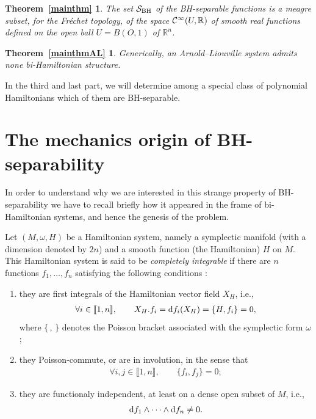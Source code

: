 \documentclass[pdftex]{sigma}%
\numberwithin{equation}{section}
\newtheorem*{Theorem1}{Theorem~\ref{mainthm}}
\newtheorem*{Theorem2}{Theorem~\ref{mainthmAL}}
\begin{document}
\begin{Theorem1}
The set ${\cal S}_{\rm BH}$ of the BH-separable functions is a meagre subset, for the Fr\'echet topology, of the space ${\cal C}^{\infty}(U,\mathbb{R})$ of smooth real functions defined on the open ball $U=B(O,1)$ of $\mathbb{R}^n$.
\end{Theorem1}

\begin{Theorem2} Generically, an Arnold--Liouville system admits none bi-Hamiltonian structure.
\end{Theorem2}

In the third and last part, we will determine among a special class of polynomial Hamiltonians which of them are BH-separable.

\section{The mechanics origin of BH-separability}

In order to understand why we are interested in this strange property of BH-separability we have to recall briefly how it appeared in the frame of bi-Hamiltonian systems, and hence the genesis of the problem.

Let $(M,\omega,H)$ be a Hamiltonian system, namely a symplectic manifold (with a dimension denoted by $2n$) and a smooth function (the Hamiltonian) $H$ on $M$. This Hamiltonian system is said to be {\it completely integrable} if there are $n$ functions $f_1,\dots,f_n$ satisfying the following conditions \cite{AbMa, Arn,LiMa}:
\begin{enumerate}\itemsep=0pt
\item[(1)] they are first integrals of the Hamiltonian vector field $X_H$, i.e.,
\begin{gather*}
\forall i\in\llbracket 1,n\rrbracket,\qquad X_H.f_i={\rm d}f_i(X_H)=\{H,f_i\}=0,
\end{gather*}
where $\{\, ,\,\}$ denotes the Poisson bracket associated with the symplectic form $\omega$;

\item[(2)] they Poisson-commute, or are in involution, in the sense that
\begin{gather*}
\forall i,j\in\llbracket 1,n\rrbracket,\qquad
\{f_i,f_j\}=0;
\end{gather*}

\item[(3)] they are functionaly independent, at least on a dense open subset of $M$, i.e.,
\begin{gather*}
{\rm d}f_1\wedge\cdots\wedge {\rm d}f_n\not=0.
\end{gather*}
\end{enumerate}
\end{document}
